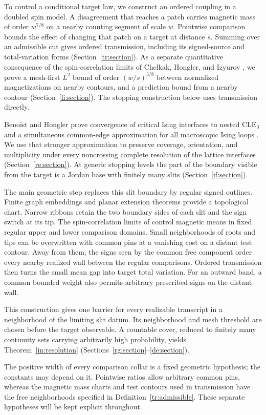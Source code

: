 To control a conditional target law, we construct an ordered coupling
in a doubled spin model. A disagreement that reaches a patch carries
magnetic mass of order $w^{7/8}$ on a nearby counting segment of scale
$w$. Pointwise comparison bounds the effect of changing that patch on
a target at distance $s$. Summing over an admissible cut gives ordered
transmission, including its signed-source and total-variation forms
(Section~\ref{tr:section}). As a separate quantitative consequence of
the spin-correlation limits of Chelkak, Hongler, and Izyurov
\cite{CHI2021}, we prove a mesh-first $L^2$ bound of order $(w/s)^{3/8}$
between normalized magnetizations on nearby contours, and a prediction
bound from a nearby contour (Section~\ref{li:section}). The stopping
construction below uses transmission directly.

Benoist and Hongler prove convergence of critical Ising interfaces to
nested $\mathrm{CLE}_3$ and a simultaneous common-edge approximation
for all macroscopic Ising loops \cite{BH2019}. We use that stronger
approximation to preserve coverage, orientation, and multiplicity under
every noncrossing complete resolution of the lattice interfaces
(Section~\ref{re:section}). At generic stopping levels the part of the
boundary visible from the target is a Jordan base with finitely many
slits (Section~\ref{if:section}).

The main geometric step replaces this slit boundary by regular signed
outlines. Finite graph embeddings and planar extension theorems
\cite{Schaefer2021,Moise1977} provide a topological chart. Narrow ribbons
retain the two boundary sides of each slit and the sign switch at its
tip. The spin-correlation limits of \cite{CHI2021} control magnetic
means in fixed regular upper and lower comparison domains. Small
neighborhoods of roots and tips can be overwritten with common pins at
a vanishing cost on a distant test contour. Away from them, the signs
seen by the common free component order every nearby realized wall
between the regular comparisons. Ordered transmission then turns the
small mean gap into target total variation. For an outward band, a
common bounded weight also permits arbitrary prescribed signs on the
distant wall.

This construction gives one barrier for every realizable transcript
in a neighborhood of the limiting slit datum. Its neighborhood and
mesh threshold are chosen before the target observable. A countable
cover, reduced to finitely many continuity sets carrying arbitrarily
high probability, yields Theorem~\ref{in:resolution}
(Sections~\ref{rg:section}--\ref{de:section}).

The positive width of every comparison collar is a fixed geometric
hypothesis; the constants may depend on it. Pointwise ratios allow
arbitrary common pins, whereas the magnetic mass charts and test
contours used in transmission have the free neighborhoods specified in
Definition~\ref{tr:admissible}. These separate hypotheses will be kept
explicit throughout.
